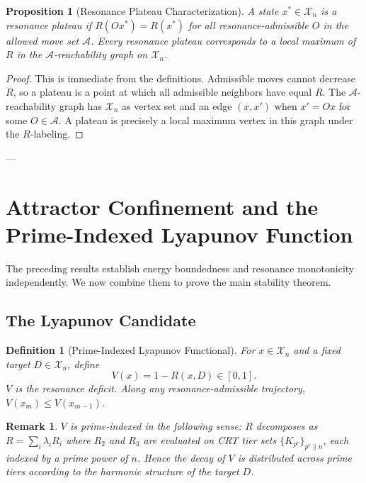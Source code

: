 \documentclass[11pt]{amsart}
\newtheorem{proposition}[theorem]{Proposition}
\newtheorem{definition}[theorem]{Definition}
\newtheorem{remark}[theorem]{Remark}
\newcommand{\X}{\mathcal{X}}
\begin{document}
\begin{proposition}[Resonance Plateau Characterization]\label{prop:plateau}
A state $x^* \in \X_n$ is a \emph{resonance plateau} if $R(O x^*) = R(x^*)$ for all resonance-admissible $O$ in the allowed move set $\mathcal{A}$. Every resonance plateau corresponds to a local maximum of $R$ in the $\mathcal{A}$-reachability graph on $\X_n$.
\end{proposition}

\begin{proof}
This is immediate from the definitions. Admissible moves cannot decrease $R$, so a plateau is a point at which all admissible neighbors have equal $R$. The $\mathcal{A}$-reachability graph has $\X_n$ as vertex set and an edge $(x, x')$ when $x' = Ox$ for some $O \in \mathcal{A}$. A plateau is precisely a local maximum vertex in this graph under the $R$-labeling.
\end{proof}

---

\section{Attractor Confinement and the Prime-Indexed Lyapunov Function}

The preceding results establish energy boundedness and resonance monotonicity independently. We now combine them to prove the main stability theorem.

\subsection{The Lyapunov Candidate}

\begin{definition}[Prime-Indexed Lyapunov Functional]\label{def:lyapunov}
For $x \in \X_n$ and a fixed target $D \in \X_n$, define
\[
  V(x) = 1 - R(x, D) \in [0, 1].
\]
$V$ is the \emph{resonance deficit}. Along any resonance-admissible trajectory, $V(x_m) \leq V(x_{m-1})$.
\end{definition}

\begin{remark}
$V$ is prime-indexed in the following sense: $R$ decomposes as $R = \sum_i \lambda_i R_i$ where $R_2$ and $R_3$ are evaluated on CRT tier sets $\{K_{p^r}\}_{p^r \| n}$, each indexed by a prime power of $n$. Hence the decay of $V$ is distributed across prime tiers according to the harmonic structure of the target $D$.
\end{remark}
\end{document}
